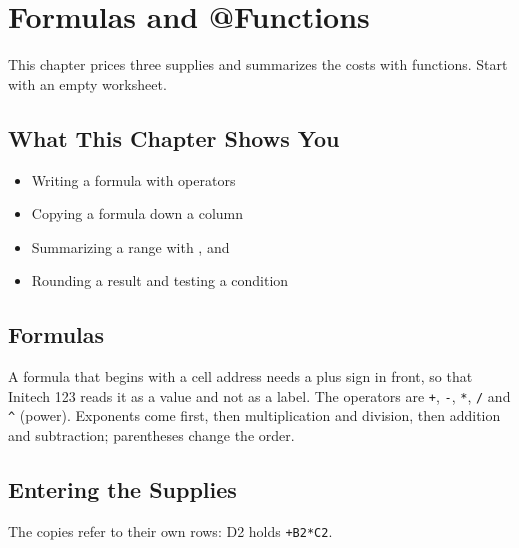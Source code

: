 \chapter{Formulas and @Functions}

This chapter prices three supplies and summarizes the costs with
functions.  Start with an empty worksheet.

\section{What This Chapter Shows You}
\begin{itemize}
\item Writing a formula with operators
\item Copying a formula down a column
\item Summarizing a range with ,  and 
\item Rounding a result and testing a condition
\end{itemize}

\section{Formulas}
A formula that begins with a cell address needs a plus sign in front, so
that Initech 123 reads it as a value and not as a label.  The operators are
\texttt{+}, \texttt{-}, \texttt{*}, \texttt{/} and \texttt{\^{}} (power).
Exponents come first, then multiplication and division, then addition and
subtraction; parentheses change the order.

\section{Entering the Supplies}
\begin{Keystrokes}
\end{Keystrokes}
The copies refer to their own rows: D2 holds \texttt{+B2*C2}.

